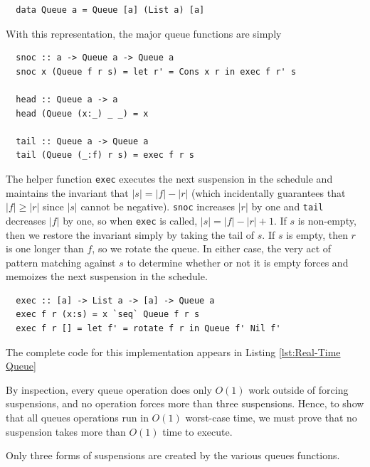 \documentclass[12pt, a4paper]{article} %
\newcommand{\code}[1]{\texttt{#1}} %
\begin{document}
\begin{verbatim}
  data Queue a = Queue [a] (List a) [a]
\end{verbatim}

With this representation, the major queue functions are simply

\begin{verbatim}
  snoc :: a -> Queue a -> Queue a
  snoc x (Queue f r s) = let r' = Cons x r in exec f r' s

  head :: Queue a -> a
  head (Queue (x:_) _ _) = x

  tail :: Queue a -> Queue a
  tail (Queue (_:f) r s) = exec f r s
\end{verbatim}

The helper function \code{exec} executes the next suspension in the schedule and maintains the invariant that $|s| = |f| - |r|$ (which incidentally guarantees that $|f| \geq |r|$ since $|s|$ cannot be negative). \code{snoc} increases $|r|$ by one and \code{tail} decreases $|f|$ by one, so when \code{exec} is called, $|s| = |f| - |r| + 1$. If $s$ is non-empty, then we restore the invariant simply by taking the tail of $s$. If $s$ is empty, then $r$ is one longer than $f$, so we rotate the queue. In either case, the very act of pattern matching against $s$ to determine whether or not it is empty forces and memoizes the next suspension in the schedule.

\begin{verbatim}
  exec :: [a] -> List a -> [a] -> Queue a
  exec f r (x:s) = x `seq` Queue f r s
  exec f r [] = let f' = rotate f r in Queue f' Nil f'
\end{verbatim}

The complete code for this implementation appears in Listing \ref{lst:Real-Time Queue}

By inspection, every queue operation does only $O(1)$ work outside of forcing suspensions, and no operation forces more than three suspensions. Hence, to show that all queues operations run in $O(1)$ worst-case time, we must prove that no suspension takes more than $O(1)$ time to execute.

Only three forms of suspensions are created by the various queues functions.
\end{document}
